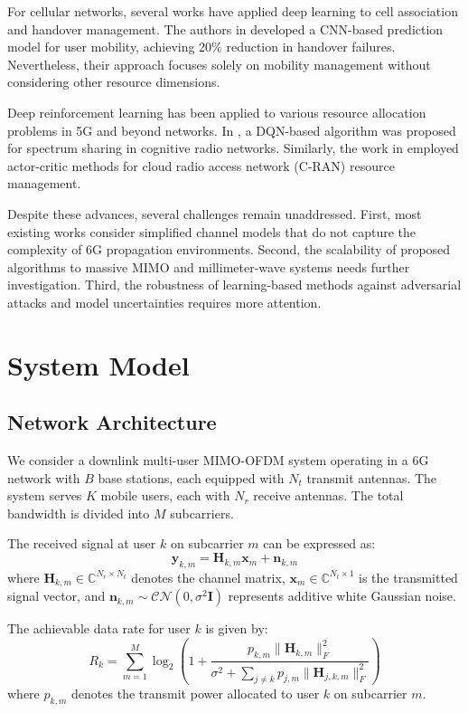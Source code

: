 \documentclass[journal]{IEEEtran}
\begin{document}
For cellular networks, several works have applied deep learning to cell association and handover management. The authors in \cite{Sun2019} developed a CNN-based prediction model for user mobility, achieving 20\% reduction in handover failures. Nevertheless, their approach focuses solely on mobility management without considering other resource dimensions.

Deep reinforcement learning has been applied to various resource allocation problems in 5G and beyond networks. In \cite{Neumann2020}, a DQN-based algorithm was proposed for spectrum sharing in cognitive radio networks. Similarly, the work in \cite{Chen2020} employed actor-critic methods for cloud radio access network (C-RAN) resource management.

Despite these advances, several challenges remain unaddressed. First, most existing works consider simplified channel models that do not capture the complexity of 6G propagation environments. Second, the scalability of proposed algorithms to massive MIMO and millimeter-wave systems needs further investigation. Third, the robustness of learning-based methods against adversarial attacks and model uncertainties requires more attention.

\section{System Model}
\subsection{Network Architecture}
We consider a downlink multi-user MIMO-OFDM system operating in a 6G network with $B$ base stations, each equipped with $N_t$ transmit antennas. The system serves $K$ mobile users, each with $N_r$ receive antennas. The total bandwidth is divided into $M$ subcarriers.

The received signal at user $k$ on subcarrier $m$ can be expressed as:
\begin{equation}
\mathbf{y}_{k,m} = \mathbf{H}_{k,m} \mathbf{x}_m + \mathbf{n}_{k,m}
\end{equation}
where $\mathbf{H}_{k,m} \in \mathbb{C}^{N_r \times N_t}$ denotes the channel matrix, $\mathbf{x}_m \in \mathbb{C}^{N_t \times 1}$ is the transmitted signal vector, and $\mathbf{n}_{k,m} \sim \mathcal{CN}(0, \sigma^2 \mathbf{I})$ represents additive white Gaussian noise.

The achievable data rate for user $k$ is given by:
\begin{equation}
R_k = \sum_{m=1}^{M} \log_2 \left(1 + \frac{p_{k,m} \|\mathbf{H}_{k,m}\|_F^2}{\sigma^2 + \sum_{j \neq k} p_{j,m} \|\mathbf{H}_{j,k,m}\|_F^2}\right)
\end{equation}
where $p_{k,m}$ denotes the transmit power allocated to user $k$ on subcarrier $m$.
\end{document}
